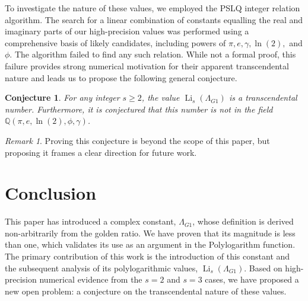 \documentclass{amsart}
\theoremstyle{plain}
\newtheorem{conjecture}[theorem]{Conjecture}
\theoremstyle{definition}
\theoremstyle{remark}
\newtheorem*{remark}{Remark}
\DeclareMathOperator{\Li}{Li} %
\newcommand{\LambdaG}{\Lambda_{G1}}
\begin{document}
To investigate the nature of these values, we employed the PSLQ integer relation algorithm. The search for a linear combination of constants equalling the real and imaginary parts of our high-precision values was performed using a comprehensive basis of likely candidates, including powers of $\pi, e, \gamma, \ln(2),$ and $\phi$. The algorithm failed to find any such relation. While not a formal proof, this failure provides strong numerical motivation for their apparent transcendental nature and leads us to propose the following general conjecture.
\begin{conjecture}
For any integer $s \ge 2$, the value $\Li_s(\LambdaG)$ is a transcendental number. Furthermore, it is conjectured that this number is not in the field $\mathbb{Q}(\pi, e, \ln(2), \phi, \gamma)$.
\end{conjecture}
\begin{remark}
Proving this conjecture is beyond the scope of this paper, but proposing it frames a clear direction for future work.
\end{remark}

\section{Conclusion}
This paper has introduced a complex constant, $\LambdaG$, whose definition is derived non-arbitrarily from the golden ratio. We have proven that its magnitude is less than one, which validates its use as an argument in the Polylogarithm function. The primary contribution of this work is the introduction of this constant and the subsequent analysis of its polylogarithmic values, $\Li_s(\LambdaG)$. Based on high-precision numerical evidence from the $s=2$ and $s=3$ cases, we have proposed a new open problem: a conjecture on the transcendental nature of these values.

\end{document}
